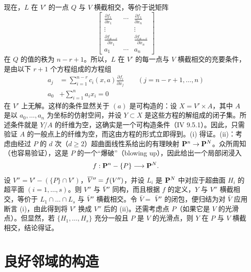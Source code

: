 现在，$L$ 在 $V'$ 的一点 $Q$ 与 $V$ 横截相交，等价于说矩阵
$$
\begin{bmatrix}
\frac{\partial f_1}{\partial x_1} & \cdots & \frac{\partial
  f_1}{\partial x_n}\\
\vdots & &\vdots\\
\frac{\partial f_{n-r}}{\partial x_1} & & \frac{\partial
  f_{n-r}}{\partial x_n}\\
a_1 & \cdots & a_n
\end{bmatrix}
$$
在 $Q$ 的值的秩为 $n-r+1$。所以，$L$ 在 $V'$ 的每一点与 $V$ 横截相交的充要条件，是由以下 $r+1$ 个方程组成的方程组
\begin{align*}
a_j &= \sum^{n-r}_{i=1} c_i (x,a)\frac{\partial f_i}{\partial x_j}\qquad
(j=n-r+1,\ldots, n)\\
a_0 &+ \sum^n_{i=1} a_i x_i =0
\end{align*}
在 $V'$ 上无解。这样的条件显然关于 $(a)$ 是可构造的：设 $X=V'\times A$，其中 $A$ 是以 $a_0,\ldots,a_n$ 为坐标的仿射空间，并设 $Y\subset X$ 是这些方程的解组成的闭子集。所述条件就是 $Y/A$ 的纤维为空，这确实是一个可构造\pageoriginale 条件（\EGA IV 9.5.1）。因此，只需 %
验证 $A$ 的一般点上的纤维为空，而这由方程的形式立即得到。(i) 得证。(ii)：考虑由经过 $P$ 的 $d$ 次（$d\geq 2$）超曲面线性系给出的有理映射 $\PP^n\rightarrow \PP^N$。众所周知（也容易验证），这是 $P$ 的一个“爆破”（blowing up），因此给出一个局部闭浸入
$$
f:\PP^n-\{P\}\longrightarrow \PP^N{\quoi}.
$$
设 $V''=V'-(\{P\}\cap V')$，$\bar{V}{}''=\sisi{f}{f}(V'')$，并设 $L_i$ 是 $\PP^N$ 中对应于超曲面 $H_i$ 的超平面 $(i=1,\ldots,s)$。则 $V''$ 与 $\bar{V}{}''$ 同构，而且根据 $f$ 的定义，$Y$ 与 $V''$ 横截相交，等价于 $L_1\cap\ldots \cap L_s$ 与 $\bar{V}{}''$ 横截相交。令 $\bar{V}=$ $\bar{V}{}''$ 的闭包，便归结为对 $\bar{V}$ 应用断言 (i)，由此得到将 $V'$ 换成 $V''$ 后的 (ii)。还需考虑点 $P$（如果它是 $V$ 的光滑点）。但显然，若 $\{H_1,\ldots,H_s\}$ 充分一般且 $P$ 是 $V$ 的光滑点，则 $Y$ 在 $P$ 与 $V$ 横截相交，结论得证。


\section{良好邻域的构造}

